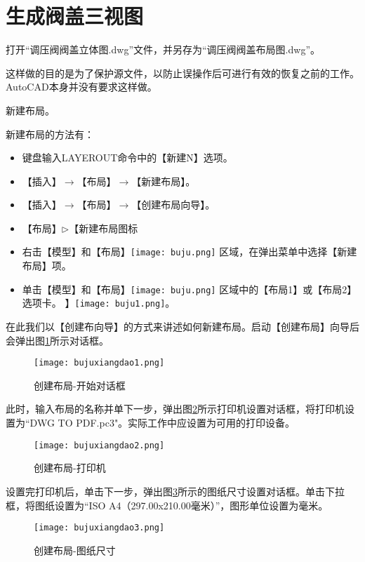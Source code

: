 \section{生成阀盖三视图}
\begin{procedure}
\item 打开“调压阀阀盖立体图.dwg”文件，并另存为“调压阀阀盖布局图.dwg”。

这样做的目的是为了保护源文件，以防止误操作后可进行有效的恢复之前的工作。AutoCAD本身并没有要求这样做。
\item 新建布局。

新建布局的方法有：
\begin{itemize}
\item 键盘输入LAYEROUT命令中的【新建N】选项。
\item 【插入】$\rightarrow$【布局】$\rightarrow$【新建布局】。
\item 【插入】$\rightarrow$【布局】$\rightarrow$【创建布局向导】。
\item 【布局】$\triangleright$【新建布局图标
\item 右击【模型】和【布局】\texttt{[image: buju.png]} 区域，在弹出菜单中选择【新建布局】项。
\item 单击【模型】和【布局】\texttt{[image: buju.png]} 区域中的【布局1】或【布局2】选项卡。
】\texttt{[image: buju1.png]}。
\end{itemize}
在此我们以【创建布向导】的方式来讲述如何新建布局。启动【创建布局】向导后会弹出图\ref{fig:bujuxiangdao1}所示对话框。
\begin{figure}[htbp]
\centering
\texttt{[image: bujuxiangdao1.png]}
\caption{创建布局-开始对话框}\label{fig:bujuxiangdao1}
\end{figure}

此时，输入布局的名称并单下一步，弹出图\ref{fig:bujuxiangdao2}所示打印机设置对话框，将打印机设置为“DWG TO PDF.pc3"。实际工作中应设置为可用的打印设备。
\begin{figure}[htbp]
\centering
\texttt{[image: bujuxiangdao2.png]}
\caption{创建布局-打印机}\label{fig:bujuxiangdao2}
\end{figure}

设置完打印机后，单击下一步，弹出图\ref{fig:bujuxiangdao3}所示的图纸尺寸设置对话框。单击下拉框，将图纸设置为“ISO A4（297.00x210.00毫米）”，图形单位设置为毫米。
\begin{figure}[htbp]
\centering
\texttt{[image: bujuxiangdao3.png]}
\caption{创建布局-图纸尺寸}\label{fig:bujuxiangdao3}
\end{figure}


\end{procedure}
